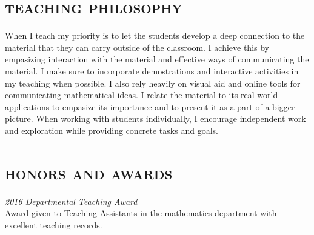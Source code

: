 \documentclass[margin, 10pt]{res} %
\begin{document}
\begin{resume}


\section{\textsc{teaching philosophy}}
When I teach my priority is to let the students develop a deep connection to the material that they can carry outside of the classroom.
I achieve this by empasizing interaction with the material and effective ways of communicating the material.
I make sure to incorporate demostrations and interactive activities in my teaching when possible.
I also rely heavily on visual aid and online tools for communicating mathematical ideas.
I relate the material to its real world applications to empasize its importance and to present it as a part of a bigger picture.
When working with students individually, I encourage independent work and exploration while providing concrete tasks and goals.

\section{\textsc{honors and awards}}
\textit{2016 Departmental Teaching Award} \\
Award given to Teaching Assistants in the mathematics department with excellent teaching records.


\end{resume}
\end{document}
